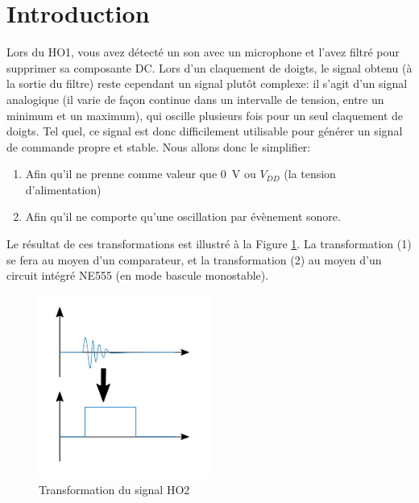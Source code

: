 \section{Introduction}

Lors du HO1, vous avez détecté un son avec un microphone et l'avez filtré pour supprimer sa composante DC. Lors d'un claquement de doigts, le signal obtenu (à la sortie du filtre) reste cependant un signal plutôt complexe: il s'agit d'un signal analogique (il varie de façon continue dans un intervalle de tension, entre un minimum et un maximum), qui oscille plusieurs fois pour un seul claquement de doigts. Tel quel, ce signal est donc difficilement utilisable pour générer un signal de commande propre et stable. Nous allons donc le simplifier:

\begin{enumerate}
    \item Afin qu'il ne prenne comme valeur que \SI{0}{V} ou $V_{DD}$ (la
tension d'alimentation)
    \item Afin qu'il ne comporte qu'une oscillation par évènement sonore.
\end{enumerate}

Le résultat de ces transformations est illustré à la Figure \ref{fig:signal-all}. La transformation (1) se fera au moyen d'un comparateur, et la transformation (2) au moyen d'un circuit intégré NE555 (en mode bascule monostable).

\begin{figure}[h!]
    \centering
    \includegraphics[width=0.5\textwidth]{signals.PNG}
    \caption{Transformation du signal HO2}
    \label{fig:signal-all}
\end{figure}